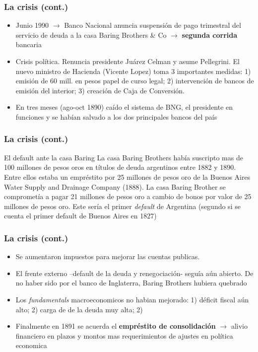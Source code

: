 \documentclass[14pt,aspectratio=169]{beamer}
\begin{document}
  
        \begin{frame}\frametitle{La crisis (cont.)}
     \begin{itemize}
     \item Junio 1990 $\longrightarrow$ Banco Nacional anuncia
       suspensión de pago trimestral del servicio de deuda a la
       casa Baring Brothers \& Co $\longrightarrow$ \textbf{segunda corrida}
       bancaria  
\item Crisis política. Renuncia presidente Juárez
  Celman y asume Pellegrini. El nuevo
  ministro de Hacienda (Vicente Lopez) toma 3 importantes medidas:
  1) emisión de 60 mill. en pesos papel de curso legal; 2)
  intervención de bancos de emisión del interior; 3) creación de Caja
  de Conversión.
  \item En tres meses (ago-oct 1890) caído el sistema
    de BNG, el presidente en funciones y se habían
    salvado a los dos principales bancos del país
     \end{itemize}
        \end{frame}

     
        \begin{frame}\frametitle{La crisis (cont.)}
          \begin{block}{El default ante la casa Baring}
            La casa Baring Brothers había suscripto mas de 100 millones
            de pesos oros en títulos de deuda argentinos entre 1882 y
            1890. Entre ellos estaba un empréstito por 25 millones de
            pesos oro de la Buenos Aires Water Supply and Drainage
            Company (1888). La casa Baring Brother se comprometía a
            pagar 21 millones de pesos oro a cambio de bonos por valor
            de 25 millones de pesos oro. Este sería el primer
            \textit{default} de Argentina (segundo si se cuenta el
            primer default de Buenos Aires en 1827)
     \end{block}
        \end{frame}


        
        
        \begin{frame}\frametitle{La crisis (cont.)}
     \begin{itemize}
     \item Se aumentaron impuestos para mejorar las cuentas publicas.
       \item El frente externo --default de la deuda y renegociación-
         seguía aún abierto. De no haber sido por el banco de
         Inglaterra, Baring Brothers hubiera quebrado
         \item Los \textit{fundamentals} macroeconomicos no habian
           mejorado: 1) déficit fiscal aún alto; 2) carga de de la
           deuda muy alta; 2)
           \item Finalmente en 1891 se acuerda el \textbf{empréstito
               de consolidación} $\longrightarrow$ alivio financiero
             en plazos y montos mas requerimientos de ajustes en
             política economica
     \end{itemize}
        \end{frame}
\end{document}
